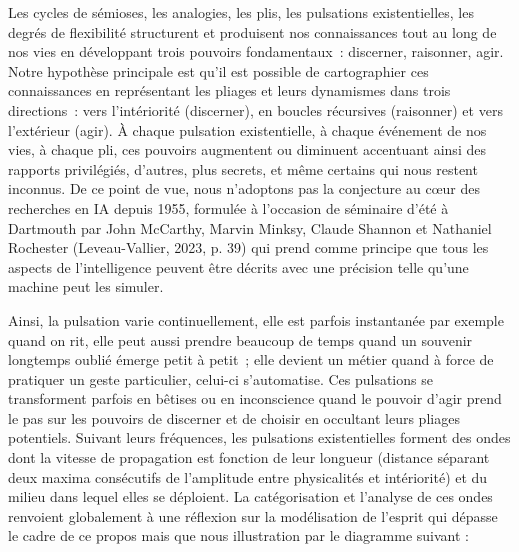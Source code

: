 \documentclass[
  a4paper,
  DIV=11,
  numbers=noendperiod]{scrreprt}
\begin{document}
Les cycles de sémioses, les analogies, les plis, les pulsations
existentielles, les degrés de flexibilité structurent et produisent nos
connaissances tout au long de nos vies en développant trois pouvoirs
fondamentaux~: discerner, raisonner, agir. Notre hypothèse principale
est qu'il est possible de cartographier ces connaissances en
représentant les pliages et leurs dynamismes dans trois directions~:
vers l'intériorité (discerner), en boucles récursives (raisonner) et
vers l'extérieur (agir). À chaque pulsation existentielle, à chaque
événement de nos vies, à chaque pli, ces pouvoirs augmentent ou
diminuent accentuant ainsi des rapports privilégiés, d'autres, plus
secrets, et même certains qui nous restent inconnus. De ce point de vue,
nous n'adoptons pas la conjecture au cœur des recherches en IA depuis
1955, formulée à l'occasion de séminaire d'été à Dartmouth par John
McCarthy, Marvin Minksy, Claude Shannon et Nathaniel Rochester
(Leveau-Vallier, 2023, p. 39) qui prend comme principe que tous les
aspects de l'intelligence peuvent être décrits avec une précision telle
qu'une machine peut les simuler.

Ainsi, la pulsation varie continuellement, elle est parfois instantanée
par exemple quand on rit, elle peut aussi prendre beaucoup de temps
quand un souvenir longtemps oublié émerge petit à petit~; elle devient
un métier quand à force de pratiquer un geste particulier, celui-ci
s'automatise. Ces pulsations se transforment parfois en bêtises ou en
inconscience quand le pouvoir d'agir prend le pas sur les pouvoirs de
discerner et de choisir en occultant leurs pliages potentiels. Suivant
leurs fréquences, les pulsations existentielles forment des ondes dont
la vitesse de propagation est fonction de leur longueur (distance
séparant deux maxima consécutifs de l'amplitude entre physicalités et
intériorité) et du milieu dans lequel elles se déploient. La
catégorisation et l'analyse de ces ondes renvoient globalement à une
réflexion sur la modélisation de l'esprit qui dépasse le cadre de ce
propos mais que nous illustration par le diagramme suivant :
\end{document}
